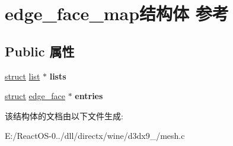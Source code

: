 \hypertarget{structedge__face__map}{}\section{edge\+\_\+face\+\_\+map结构体 参考}
\label{structedge__face__map}
\subsection*{Public 属性}
\begin{DoxyCompactItemize}
\item 
\mbox{\label{structedge__face__map_afca15d9f1be0b21f1a0667ec140c53fc}} 
\hyperlink{interfacestruct}{struct} \hyperlink{classlist}{list} $\ast$ {\bfseries lists}
\item 
\mbox{\label{structedge__face__map_a22fcc729b311eb491eb13cc8b0bd889e}} 
\hyperlink{interfacestruct}{struct} \hyperlink{structedge__face}{edge\+\_\+face} $\ast$ {\bfseries entries}
\end{DoxyCompactItemize}


该结构体的文档由以下文件生成\+:\begin{DoxyCompactItemize}
\item 
E\+:/\+React\+O\+S-\/0../dll/directx/wine/d3dx9\+\_/mesh.\+c\end{DoxyCompactItemize}
